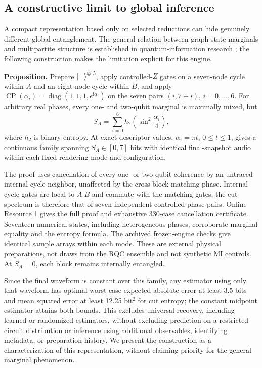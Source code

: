 \documentclass[pdflatex,iicol,sn-basic,Numbered]{sn-jnl}
\begin{document}
\subsection{A constructive limit to global inference}\label{sec:nogo}
A compact representation based only on selected reductions can hide genuinely different global entanglement. The general relation between graph-state marginals and multipartite structure is established in quantum-information research \citep{Hein2004,Vandre2025}; the following construction makes the limitation explicit for this engine.

\textbf{Proposition.} Prepare $|+\rangle^{\otimes15}$, apply controlled-$Z$ gates on a seven-node cycle within $A$ and an eight-node cycle within $B$, and apply $\operatorname{CP}(\alpha_i)=\operatorname{diag}(1,1,1,e^{\mathrm i\alpha_i})$ on the seven pairs $(i,7+i)$, $i=0,\ldots,6$. For arbitrary real phases, every one- and two-qubit marginal is maximally mixed, but
\begin{equation}
S_A=\sum_{i=0}^{6}h_2\left(\sin^2\frac{\alpha_i}{4}\right),
\end{equation}
where $h_2$ is binary entropy. At exact descriptor values, $\alpha_i=\pi t$, $0\le t\le1$, gives a continuous family spanning $S_A\in[0,7]$ bits with identical final-snapshot audio within each fixed rendering mode and configuration.

The proof uses cancellation of every one- or two-qubit coherence by an untraced internal cycle neighbor, unaffected by the cross-block matching phase. Internal cycle gates are local to $A|B$ and commute with the matching gates; the cut spectrum is therefore that of seven independent controlled-phase pairs. Online Resource 1 gives the full proof and exhaustive 330-case cancellation certificate. Seventeen numerical states, including heterogeneous phases, corroborate marginal equality and the entropy formula. The archived frozen-engine checks give identical sample arrays within each mode. These are external physical preparations, not draws from the RQC ensemble and not synthetic MI controls. At $S_A=0$, each block remains internally entangled.

Since the final waveform is constant over this family, any estimator using only that waveform has optimal worst-case expected absolute error at least 3.5 bits and mean squared error at least 12.25 bit$^2$ for cut entropy; the constant midpoint estimator attains both bounds. This excludes universal recovery, including learned or randomized estimators, without excluding prediction on a restricted circuit distribution or inference using additional observables, identifying metadata, or preparation history. We present the construction as a characterization of this representation, without claiming priority for the general marginal phenomenon.
\end{document}
